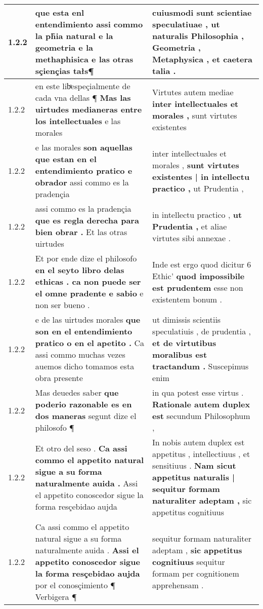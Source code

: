 \begin{tabular}{|p{1cm}|p{6.5cm}|p{6.5cm}|}
1.2.2 & que esta enl entendimiento \textbf{ assi commo la ph̃ia natural e la geometria e la methaphisica } e las otras sçiençias tałs¶ & cuiusmodi sunt scientiae speculatiuae , \textbf{ ut naturalis Philosophia , Geometria , Metaphysica , } et caetera talia . \\\hline
1.2.2 & en este libͤespeçialmente de cada vna dellas ¶ \textbf{ Mas las uirtudes medianeras entre los intellectuales } e las morales & Virtutes autem mediae \textbf{ inter intellectuales et morales , } sunt virtutes existentes \\\hline
1.2.2 & e las morales \textbf{ son aquellas que estan en el entendimiento pratico e obrador } assi commo es la pradençia & inter intellectuales et morales , \textbf{ sunt virtutes existentes | in intellectu practico , } ut Prudentia , \\\hline
1.2.2 & assi commo es la pradençia \textbf{ que es regla derecha para bien obrar . } Et las otras uirtudes & in intellectu practico , \textbf{ ut Prudentia , } et aliae virtutes sibi annexae . \\\hline
1.2.2 & Et por ende dize el philosofo \textbf{ en el seyto libro delas ethicas . ca non puede ser el omne pradente e sabio } e non ser bueno . & Inde est ergo quod dicitur 6 Ethic’ \textbf{ quod impossibile est prudentem } esse non existentem bonum . \\\hline
1.2.2 & e de las uirtudes morales \textbf{ que son en el entendimiento pratico o en el apetito . } Ca assi commo muchas vezes auemos dicho tomamos esta obra presente & ut dimissis scientiis speculatiuis , de prudentia , \textbf{ et de virtutibus moralibus est tractandum . } Suscepimus enim \\\hline
1.2.2 & Mas deuedes saber \textbf{ que poderio razonable es en dos maneras } segunt dize el philosofo ¶ & in qua potest esse virtus . \textbf{ Rationale autem duplex est } secundum Philosophum , \\\hline
1.2.2 & Et otro del seso . \textbf{ Ca assi commo el appetito natural sigue a su forma naturalmente auida . } Assi el appetito conoscedor sigue la forma resçebidao aujda & In nobis autem duplex est appetitus , intellectiuus , et sensitiuus . \textbf{ Nam sicut appetitus naturalis | sequitur formam naturaliter adeptam , } sic appetitus cognitiuus \\\hline
1.2.2 & Ca assi commo el appetito natural sigue a su forma naturalmente auida . \textbf{ Assi el appetito conoscedor sigue la forma resçebidao aujda } por el conosçimiento ¶ Verbigera ¶ & sequitur formam naturaliter adeptam , \textbf{ sic appetitus cognitiuus } sequitur formam per cognitionem apprehensam . \\\hline

\end{tabular}
